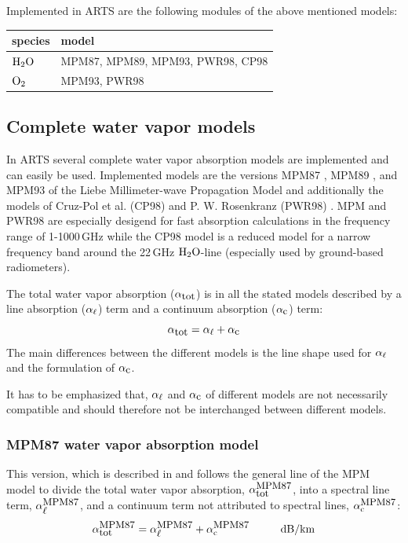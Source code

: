 Implemented in ARTS are the following modules of the above mentioned models:
%
\begin{center}
\begin{tabular}{ll}
\hline
species & model\\
\hline
$\mbox{H}_2\mbox{O}$ & MPM87, MPM89, MPM93, PWR98, CP98 \\
$\mbox{O}_2$  & MPM93, PWR98 \\
\hline
\end{tabular}
\end{center}




\subsection{Complete water vapor models}
\label{levelc:CompWatVapMod}
In ARTS several complete water vapor absorption models are implemented and 
can easily be used. Implemented models are the versions 
MPM87 \citep{liebeandlayton:87}, MPM89 \citep{liebe:89}, and 
MPM93 \citep{liebeetal:93} of the Liebe Millimeter-wave Propagation Model 
and additionally the models of Cruz-Pol et al. (CP98) \citep{cruzpol:98} 
and P. W. Rosenkranz (PWR98) \citep{pwr:98}. 
MPM and PWR98 are especially desigend for fast absorption calculations in 
the frequency range of 1-1000\,GHz while the CP98 model is a reduced model 
for a narrow frequency band around the 22\,GHz $\mbox{H}_2\mbox{O}$-line (especially used 
by ground-based radiometers).

The total water vapor absorption ($\alpha_{\mbox{\rm \small tot}}$) is in all the stated models 
described by a line absorption ($\alpha_{\ell}$) term and a continuum absorption 
($\alpha_{\mbox{\small c}}$) term: 
\begin{equation}
  \label{eq:abs_theory:h2o:totabs}
  \alpha_{\mbox{\rm \small tot}} = \alpha_{\ell} + \alpha_{\mbox{\small c}}
\end{equation}
The main differences between the different models is the line shape used for 
$\alpha_{\ell}$ and the formulation of $\alpha_{\mbox{\small c}}$.

It has to be emphasized that, $\alpha_{\ell}$ and $\alpha_{\mbox{\small c}}$ of different
models are not necessarily compatible and should therefore not be 
interchanged between different models.


\subsubsection{MPM87 water vapor absorption model}
\label{leveld:mpm87}
This version, which is described in \citet{liebeandlayton:87} and 
follows the general line of the MPM model to divide the total 
water vapor absorption, $\alpha^{\mbox{\rm \small MPM87}}_{\mbox{\small tot}}$, into a spectral line 
term, $\alpha^{\mbox{\rm \small MPM87}}_{\mbox{\small $\ell$}}$, and a continuum term not attributed to 
spectral lines, $\alpha^{\mbox{\rm \small MPM87}}_{\rm c}$:
\begin{equation}
  \label{eq:abs_theory:mpm87_abs}
  \alphampmotot = \alphampmol + \alphampmoc\hspace*{10mm}\mbox{dB/km}
\end{equation}



